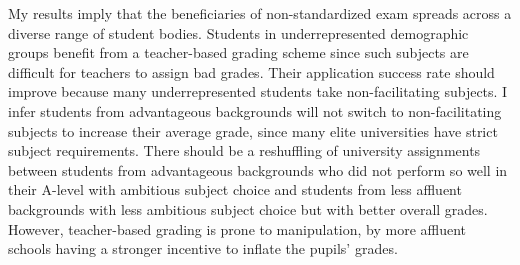 My results imply that the beneficiaries of non-standardized exam spreads across a diverse range of student bodies. Students in underrepresented demographic groups benefit from a teacher-based grading scheme since such subjects are difficult for teachers to assign bad grades. Their application success rate should improve because many underrepresented students take non-facilitating subjects. I infer students from advantageous backgrounds will not switch to non-facilitating subjects to increase their average grade, since many elite universities have strict subject requirements. There should be a reshuffling of university assignments between students from advantageous backgrounds who did not perform so well in their A-level with ambitious subject choice and students from less affluent backgrounds with less ambitious subject choice but with better overall grades. However, teacher-based grading is prone to manipulation, by more affluent schools having a stronger incentive to inflate the pupils' grades. 
\clearpage